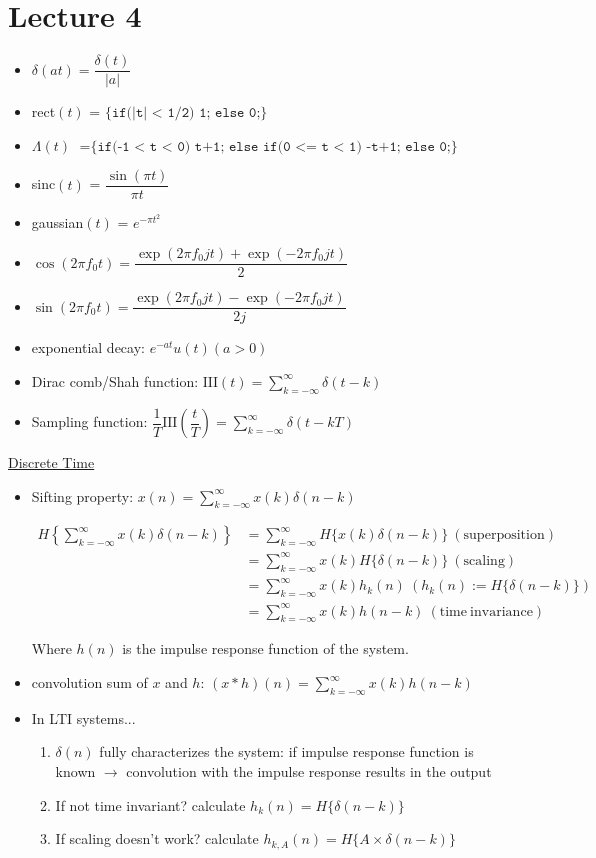 \documentclass{article}
\begin{document}
\section{Lecture 4}
\begin{itemize}
\item $\delta(at) = \dfrac{\delta(t)}{|a|}$
\item rect$(t)$ = $\texttt{\{if(|t| < 1/2) 1; else 0;\}}$  %
\item $\Lambda(t)$ $= \texttt{\{if(-1 < t < 0) t+1; else if(0 <= t < 1) -t+1; else 0;\}}$
\item sinc$(t)$ = $\dfrac{\sin(\pi t)}{\pi t}$
\item gaussian$(t)$ = $e^{-\pi t^2}$
\item $\cos(2\pi f_0t) = \dfrac{\exp(2\pi f_0jt) + \exp(-2\pi f_0jt)}{2}$
\item $\sin(2\pi f_0t) = \dfrac{\exp(2\pi f_0jt) - \exp(-2\pi f_0jt)}{2j}$
\item exponential decay: $e^{-at}u(t) (a > 0)$
\item Dirac comb/Shah function: $\mathrm{III}(t) = \displaystyle\sum_{k=-\infty}^{\infty}{\delta(t-k)}$
\item Sampling function: $\dfrac{1}{T}\mathrm{III}\left(\dfrac{t}{T}\right) = \displaystyle\sum_{k=-\infty}^{\infty}{\delta(t-kT)}$
\end{itemize}
\underline{Discrete Time}
\begin{itemize}
\item Sifting property: $x(n) = \displaystyle\sum_{k=-\infty}^{\infty}{x(k)\delta(n-k)}$

\begin{align*}
  H\left\{\sum_{k=-\infty}^{\infty}{x(k)\delta(n-k)}\right\} &= \sum_{k=-\infty}^{\infty}{H\{x(k)\delta(n-k)\}}\:(\mathrm{superposition})\\
  &= \sum_{k=-\infty}^{\infty}x(k)H\{\delta(n-k)\}\:(\mathrm{scaling})\\ 
  &= \sum_{k=-\infty}^{\infty}x(k)h_k(n) \:(h_k(n) := H\{\delta(n-k)\})\\
  &= \sum_{k=-\infty}^{\infty}{x(k)h(n-k)}\:(\mathrm{time\: invariance})
\end{align*}

Where $h(n)$ is the impulse response function of the system.

  \item convolution sum of $x$ and $h$: $(x*h)(n) = \displaystyle\sum_{k=-\infty}^{ \infty}{x(k)h(n-k)}$
  
  \item In LTI systems...
\begin{enumerate}
\item $\delta(n)$ fully characterizes the system: if impulse response function is known $\rightarrow$ convolution with the impulse response results in the output
\item If not time invariant? calculate $h_k(n) = H\{\delta(n-k)\}$
\item If scaling doesn't work? calculate $h_{k, A}(n) = H\{A\times \delta(n-k)\}$
\end{enumerate}

\end{itemize}
\end{document}
